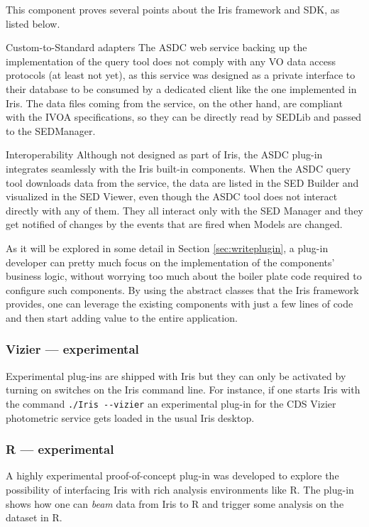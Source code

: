 \documentclass[preprint,authoryear,5p]{elsarticle}
\begin{document}
This component proves several points about the Iris framework and SDK, as listed below.
\begin{description} \begin{sloppypar}
\item[Custom-to-Standard adapters] The ASDC web service
backing up the implementation of the query tool does not comply with any VO data
access protocols (at least not yet), as this service was designed as a private interface
to their database to be consumed by a dedicated client like the one implemented in
Iris. The data files coming from the service, on the other hand, are compliant
with the IVOA specifications, so they can be directly read by SEDLib and passed
to the SEDManager.
  \item[Interoperability] Although not
designed as part of Iris, the ASDC plug-in integrates seamlessly with the Iris built-in
components. When the ASDC query tool downloads data from the service, the data
are listed in the SED Builder and visualized in the SED Viewer, even though the
ASDC tool
does not interact directly with any of them. They all interact only with the SED
Manager and they get notified of changes by the events that are fired when
Models are changed.\end{sloppypar}  \item[The Iris SDK] As it will be explored in some detail
in Section \ref{sec:writeplugin}, a plug-in developer can pretty much focus on
the implementation of the components' business logic, without worrying too much
about the boiler plate code required to configure such components. By using the
abstract classes that the Iris framework provides, one can leverage the existing
components with just a few lines of code and then start adding value to the
entire application.  \end{description}

\subsubsection{Vizier --- experimental} \label{sec:asdc} Experimental plug-ins
are shipped with Iris but they can only be activated by turning on switches on
the Iris command line. For instance, if one starts Iris with the command
\verb|./Iris --vizier| an experimental plug-in for the CDS Vizier photometric
service gets loaded in the usual Iris desktop.

\subsubsection{R --- experimental} A highly experimental proof-of-concept
plug-in was developed to explore the possibility of interfacing Iris with rich
analysis environments like R. The plug-in shows how one can \emph{beam} data
from Iris to R and trigger some analysis on the dataset in R.
\end{document}
